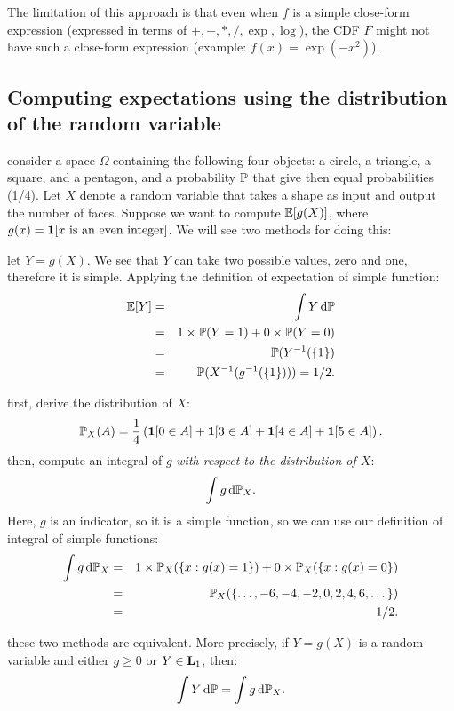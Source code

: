 \documentclass{article}
\begin{document}
The limitation of this approach is that even when $f$ is a simple close-form expression (expressed in terms of $+, -, *, /, \exp, \log$), the CDF $F$ might not have such a close-form expression (example: $f(x) = \exp(-x^2)$).


\subsection{Computing expectations using the distribution of the random variable}\label{sec:change-of-var}

 consider a space $\Omega$ containing the following four objects: a circle, a triangle, a square, and a pentagon, and a probability $\P$ that give then equal probabilities (1/4). Let $X$ denote a random variable that takes a shape as input and output the number of faces. Suppose we want to compute $\E[g(X)]$, where $g(x) = \1[x \text{ is an even integer}]$. We will see two methods for doing this:

 let $Y = g(X)$. We see that $Y$ can take two possible values, zero and one, therefore it is simple. Applying the definition of expectation of simple function:
\begin{eqnarray*} 
\E[Y] &=& \int Y \ud \P \\
&=& 1\times \P(Y = 1) + 0\times \P(Y = 0) \\
&=& \P(Y^{-1}(\{1\}) \\
&=& \P(X^{-1}(g^{-1}(\{1\}))) = 1/2.
\end{eqnarray*}

 first, derive the distribution of $X$:
\[ \P_X(A) = \frac{1}{4}\left( \1[0 \in A] + \1[3 \in A] + \1[4 \in A] + \1[5 \in A] \right). \]
then, compute an integral of $g$ \emph{with respect to the distribution of $X$}:
\[ \int g \ud \P_X. \]
Here, $g$ is an indicator, so it is a simple function, so we can use our definition of integral of simple functions:
\begin{eqnarray*}
\int g \ud \P_X &=& 1 \times \P_X(\{x : g(x) = 1\}) + 0 \times \P_X(\{x : g(x) = 0\}) \\
&=& \P_X(\{\dots, -6, -4, -2, 0, 2, 4, 6, \dots\}) \\
&=& 1/2.
\end{eqnarray*}

 these two methods are equivalent. More precisely, if $Y = g(X)$ is a random variable and either $g \ge 0$ or $Y \in \L_1$, then:
\[ \int Y \ud \P = \int g \ud \P_X. \]
\end{document}

